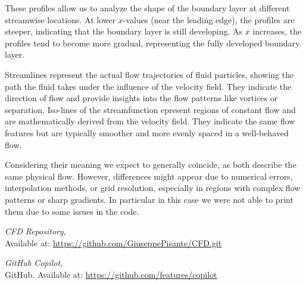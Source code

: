 \documentclass{article}
\begin{document}
These profiles allow us to analyze the shape of the boundary layer at different streamwise locations. At lower $x$-values (near the leading edge), the profiles are steeper, indicating that the boundary layer is still developing.
As $x$ increases, the profiles tend to become more gradual, representing the fully developed boundary layer.

Streamlines represent the actual flow trajectories of fluid particles, showing the path the fluid takes under the influence of the velocity field. They indicate the direction of flow and provide insights into the flow patterns like vortices or separation.
Iso-lines of the streamfunction epresent regions of constant flow and are mathematically derived from the velocity field. They indicate the same flow features but are typically smoother and more evenly spaced in a well-behaved flow.

Considering their meaning we expect to generally coincide, as both describe the same physical flow. However, differences might appear due to numerical errors, interpolation methods, or grid resolution, especially in regions with complex flow patterns or sharp gradients.
In particular in this case we were not able to print them due to some issues in the code.


\begin{thebibliography}{9}
    \textit{CFD Repository},\\
    Available at: \url{https://github.com/GiuseppePisante/CFD.git}
    
    \textit{GitHub Copilot},\\
    GitHub. Available at: \url{https://github.com/features/copilot}
    \end{thebibliography}
\end{document}

